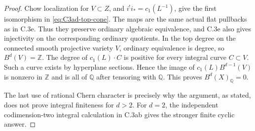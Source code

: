\begin{proof}
Chow localization for $V\subset Z$, and
$i^!i_*=c_1(L^{-1})$, give the first isomorphism
in \eqref{eq:C3ad-top-cone}. The maps are the same actual
flat pullbacks as in C.3e. Thus they preserve ordinary
algebraic equivalence, and C.3e also gives injectivity
on the corresponding ordinary quotients. In the top
degree on the connected smooth projective variety $V$,
ordinary equivalence is degree, so $B^d(V)=\mathbb Z$.
The degree of $c_1(L)\cdot C$ is positive for every
integral curve $C\subset V$. Such a curve exists by
hyperplane sections. Hence the image of
$c_1(L)B^{d-1}(V)$ is nonzero in $\mathbb Z$ and is
all of $\mathbb Q$ after tensoring with $\mathbb Q$.
This proves $B^d(X)_{\mathbb Q}=0$.

The last use of rational Chern character is precisely
why the argument, as stated, does not prove integral
finiteness for $d>2$. For $d=2$, the independent
codimension-two integral calculation in C.3ab gives
the stronger finite cyclic answer.
\end{proof}
